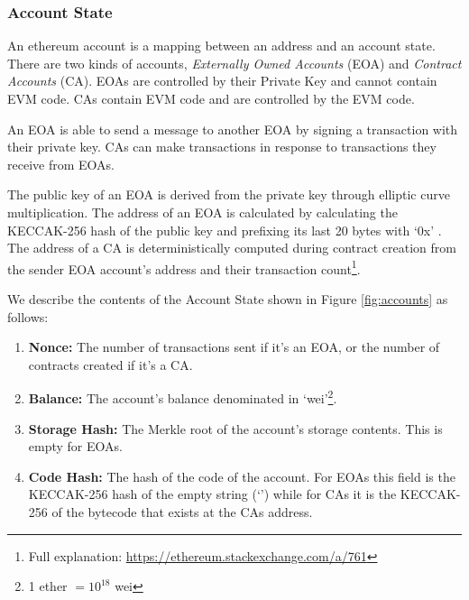 

\subsubsection{Account State}
An ethereum account is a mapping between an address and an account state. There are two kinds of accounts, \textit{Externally Owned Accounts} (EOA) and \textit{Contract Accounts} (CA). EOAs are controlled by their Private Key and cannot contain EVM code. CAs contain EVM code and are controlled by the EVM code.



An EOA is able to send a message to another EOA by signing a transaction with their private key. CAs can make transactions in response to transactions they receive from EOAs. 



The public key of an EOA is derived from the private key through elliptic curve multiplication. The address of an EOA is calculated by calculating the KECCAK-256 hash of the public key and prefixing its last 20 bytes with `0x' \cite{ethereum}. The address of a CA is deterministically computed during contract creation from the sender EOA account's address and their transaction count\footnote{Full explanation: \url{https://ethereum.stackexchange.com/a/761}}.

We describe the contents of the Account State shown in Figure \ref{fig:accounts} as follows:
\begin{enumerate}
    \item \textbf{Nonce:} The number of transactions sent if it's an EOA, or the number of contracts created if it's a CA.
    \item \textbf{Balance:} The account's balance denominated in `wei'\footnote{1 ether $= 10^{18}$ wei }.
    \item \textbf{Storage Hash:} The Merkle root of the account's storage contents. This is empty for EOAs.
    \item \textbf{Code Hash:} The hash of the code of the account. For EOAs this field is the KECCAK-256 hash of the empty string (`') while for CAs it is the KECCAK-256 of the bytecode that exists at the CAs address.
\end{enumerate}


